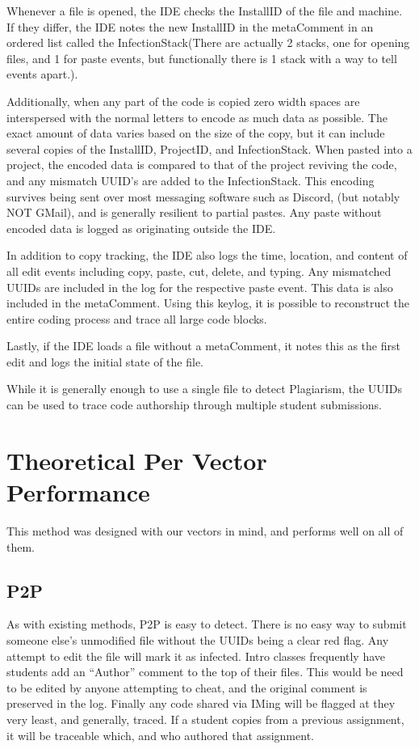 \documentclass[12pt,final,thesis,actual]{uhthesis}
\newcommand{\installID}{InstallID\xspace}
\newcommand{\projectID}{ProjectID\xspace}
\newcommand{\metaComment}{metaComment\xspace}
\newcommand{\infectionStack}{InfectionStack\xspace}
\begin{document}
Whenever a file is opened, the IDE checks the \installID of the file and machine.  If they differ, the IDE notes the new \installID in the \metaComment in an ordered list called the \infectionStack (There are actually 2 stacks, one for opening files, and 1 for paste events, but functionally there is 1 stack with a way to tell events apart.).  

Additionally, when any part of the code is copied zero width spaces are interspersed with the normal letters to encode as much data as possible.  The exact amount of data varies based on the size of the copy, but it can include several copies of the \installID, \projectID, and \infectionStack.  When pasted into a project, the encoded data is compared to that of the project reviving the code, and any mismatch UUID's are added to the \infectionStack. This encoding survives being sent over most messaging software such as Discord, (but notably NOT GMail), and is generally resilient to partial pastes.  Any paste without encoded data is logged as originating outside the IDE.

In addition to copy tracking, the IDE also logs the time, location, and content of all edit events including copy, paste, cut, delete, and typing.  Any mismatched UUIDs are included in the log for the respective paste event.  This data is also included in the \metaComment.  Using this keylog, it is possible to reconstruct the entire coding process and trace all large code blocks.

Lastly, if the IDE loads a file without a \metaComment, it notes this as the first edit and logs the initial state of the file.

While it is generally enough to use a single file to detect Plagiarism, the UUIDs can be used to trace code authorship through multiple student submissions.

\section{\textbf{Theoretical Per Vector Performance}}
This method was designed with our vectors in mind, and performs well on all of them.
\subsection{\textbf{P2P}}
		As with existing methods, P2P is easy to detect.  There is no easy way to submit someone else's unmodified file without the UUIDs being a clear red flag.  Any attempt to edit the file will mark it as infected.  Intro classes frequently have students add an ``Author'' comment to the top of their files.  This would be need to be edited by anyone attempting to cheat, and the original comment is preserved in the log. Finally any code shared via IMing will be flagged at they very least, and generally, traced.   If a student copies from a previous assignment, it will be traceable which, and who authored that assignment.
		
\end{document}
